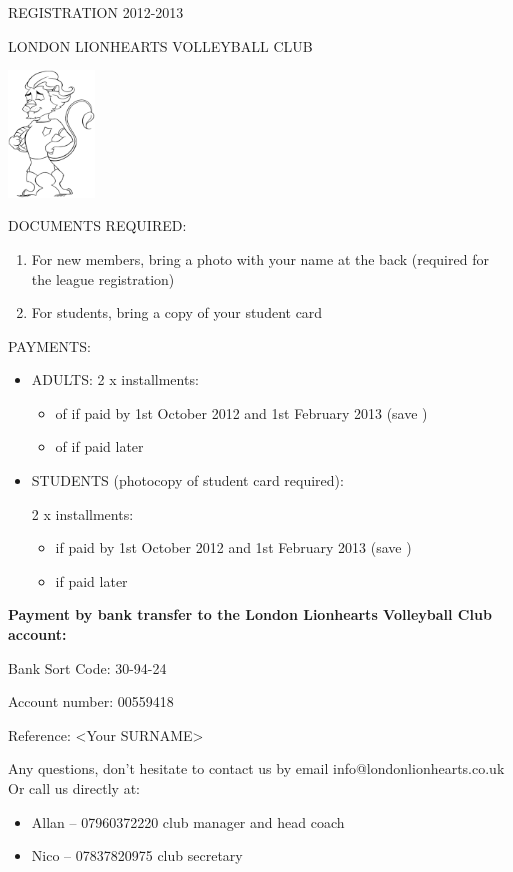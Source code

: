 \documentclass[a4paper,12pt]{article}
\begin{document}
\normalsize
\begin{center}
REGISTRATION 2012-2013

LONDON LIONHEARTS VOLLEYBALL CLUB
\vspace{0.5cm}

\includegraphics[width=2.3cm]{lions.png}
\end{center}

DOCUMENTS REQUIRED:
\begin{enumerate}
  \item For new members, bring a photo with your name at the back
(required for the league registration)
 \item For students, bring a copy of your student card
\end{enumerate}


PAYMENTS:
\begin{itemize}
\item ADULTS:
2 x installments:
\begin{itemize}
  \item of  if paid by 1st October 2012 and 1st February 2013 (save )
  \item of  if paid later
\end{itemize}

\item STUDENTS (photocopy of student card required):

2 x installments:
\begin{itemize}
  \item {} if paid by 1st October 2012 and 1st February 2013 (save )
  \item {} if paid later
\end{itemize}
\end{itemize}

{\bfseries Payment by bank transfer to the London Lionhearts Volleyball Club account:}

Bank Sort Code: 30-94-24

Account number: 00559418

Reference: <Your SURNAME>

Any questions, don’t hesitate to contact us by email info@londonlionhearts.co.uk
Or call us directly at:

\begin{itemize}
  \item Allan – 07960372220	club manager and head coach
  \item Nico – 07837820975	club secretary
\end{itemize}
\newpage
\end{document}
